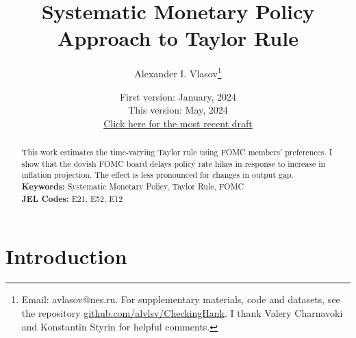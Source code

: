 \documentclass[11pt]{article}
\title{Systematic Monetary Policy Approach to Taylor Rule}
\author{Alexander I. Vlasov\thanks{Email: avlasov@nes.ru. For supplementary materials, code and datasets, see the repository \href{https://github.com/alvlsv/CheckingHank}{github.com/alvlsv/CheckingHank}. I thank Valery Charnavoki and Konstantin Styrin for helpful comments.}}
\date{\normalsize First version: January, 2024\\\vspace{1ex} This version: May, 2024\\ \vspace{1ex}
\href{https://github.com/alvlsv/CheckingHank/blob/6906f23fcb1a16aa4fc9997532f52c1659e9c29f/Checking_HANK/Paper/CheckingHANK.pdf}{Click here for the most recent draft}}
\begin{document}
\maketitle



\begin{abstract}
    \noindent This work estimates the time-varying Taylor rule using FOMC members' preferences. I show that the dovish FOMC board delays policy rate hikes in response to increase in inflation projection. The effect is less pronounced for changes in output gap.
    \\
    \noindent\textbf{Keywords:} Systematic Monetary Policy, Taylor Rule, FOMC
    \\
    \noindent\textbf{JEL Codes:} E21, E52, E12 \\
    \bigskip
\end{abstract}

\section{Introduction}


\end{document}
